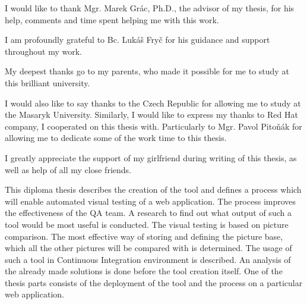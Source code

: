\documentclass[11pt,oneside,final]{fithesis2}
\begin{document}
\newenvironment{atribut_description}
{\begin{description}
  \renewcommand{\makelabel}[1]{\texttt{\hspace{6pt}##1 $-$}}%
  \setlength{\itemsep}{1pt}
  \setlength{\parskip}{0pt}
  \setlength{\parsep}{0pt}}
{\end{description}}
\renewcommand{\tiny}{\fontsize{7.7}{9.7}\selectfont}

\FrontMatter
\ThesisTitlePage

\begin{ThesisDeclaration}
\DeclarationText
\AdvisorName
\end{ThesisDeclaration}

\begin{ThesisThanks}
I would like to thank Mgr. Marek Grác, Ph.D., the advisor of my thesis, for his help, comments and time spent helping me with this work.

I am profoundly grateful to Bc. Lukáš Fryč for his guidance and support throughout my work.

My deepest thanks go to my parents, who made it possible for me to study at this brilliant university. 

I would also like to say thanks to the Czech Republic for allowing me to study at the Masaryk University. Similarly, I would like to express
my thanks to Red Hat company, I cooperated on this thesis with. Particularly to Mgr. Pavol Pitoňák for allowing me to dedicate some of the
work time to this thesis.

I greatly appreciate the support of my girlfriend during writing of this thesis, as well as help of all my close friends.

\end{ThesisThanks}

\begin{ThesisAbstract}
This diploma thesis describes the creation of the tool and defines a process which will enable automated visual testing of a web application. 
The process improves the effectiveness of the QA team. A research to find out what output of such a tool would be most useful is conducted.
The visual testing is based on picture comparison. The most effective way of storing and defining 
the picture base, which all the other pictures will be compared with is determined. 
The usage of such a tool in Continuous Integration environment is described. 
An analysis of the already made solutions is done before the tool creation itself. 
One of the thesis parts consists of the deployment of the tool and the process on a particular web application.
\end{ThesisAbstract}
 
\end{document}
